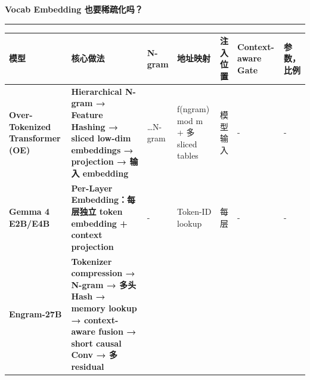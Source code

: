 \documentclass[
  11pt,
  a4paper,
  fontset=none]{ctexart}
\author{}
\date{}
\newcounter{none} %
\newcommand{\NotesCover}[1]{%
  \pagenumbering{roman}%
  \thispagestyle{empty}%
  \vspace*{0mm}%
  {\centering
    \sffamily\bfseries\color{attentionblue}%
    \fontsize{26pt}{36pt}\selectfont #1\par
  }%
  \vspace{4mm}%
  {\color{attentionblue}\noindent\rule{\linewidth}{0.6pt}\par}%
  \vspace{4mm}%
  \begingroup
    \setlength{\parindent}{0pt}%
    \setlength{\parskip}{0.6em}%
    \tableofcontents
  \endgroup
}
\newcommand{\OverviewTableStyle}{%
  \linespread{1}\fontsize{8.5pt}{10.5pt}\selectfont
  \setlength{\tabcolsep}{2.5pt}%
  \renewcommand{\arraystretch}{1.15}%
  \setlength{\extrarowheight}{6pt}%
  \setlength{\LTpre}{22pt}%
  \setlength{\LTpost}{0pt}%
  \setlength{\parskip}{0pt}%
}
\begin{document}
\NotesCover{Vocab Embedding 也要稀疏化吗？}

\begingroup\OverviewTableStyle

{\def\LTcaptype{none} %
\begin{longtable}[]{@{}
  >{\centering\arraybackslash}p{}
  >{\centering\arraybackslash}p{}
  >{\centering\arraybackslash}p{}
  >{\centering\arraybackslash}p{}
  >{\centering\arraybackslash}p{}
  >{\centering\arraybackslash}p{}
  >{\centering\arraybackslash}p{}@{}}
\toprule\noalign{}
\begin{minipage}[b]{\linewidth}\centering
\textbf{模型}
\end{minipage} & \begin{minipage}[b]{\linewidth}\centering
\textbf{核心做法}
\end{minipage} & \begin{minipage}[b]{\linewidth}\centering
\textbf{N-gram}
\end{minipage} & \begin{minipage}[b]{\linewidth}\centering
\textbf{地址映射}
\end{minipage} & \begin{minipage}[b]{\linewidth}\centering
\textbf{注入位置}
\end{minipage} & \begin{minipage}[b]{\linewidth}\centering
\textbf{Context-aware Gate}
\end{minipage} & \begin{minipage}[b]{\linewidth}\centering
\textbf{参数，比例}
\end{minipage} \\
\midrule\noalign{}
\endhead
\bottomrule\noalign{}
\endlastfoot
\textbf{Over-Tokenized Transformer (OE)} & \textbf{Hierarchical N-gram →
Feature Hashing → sliced low-dim embeddings → projection → 输入
embedding} & 1\ldots N-gram & f(ngram) mod m + 多 sliced tables &
模型输入 & - & - \\
\textbf{Gemma 4 E2B/E4B} & \textbf{Per-Layer Embedding：每层独立 token
embedding + context projection} & - & Token-ID lookup & 每层 & - & - \\
\textbf{Engram-27B} & \textbf{Tokenizer compression → N-gram → 多头 Hash
→ memory lookup → context-aware fusion → short causal Conv → 多 residual
}
\end{longtable}}
\end{document}
